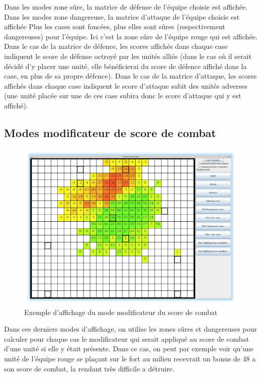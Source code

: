 			Dans les modes zone sûre, la matrice de défense de l'équipe choisie est affichée.
			Dans les modes zone dangereuse, la matrice d'attaque de l'équipe choisie est affichée
			Plus les cases sont foncées, plus elles sont sûres (respectivement dangereuses) pour l'équipe.
			Ici c'est la zone sûre de l'équipe rouge qui est affichée.
                        Dans le cas de la matrice de défence, les scores affichés dans chaque case indiquent le score de défense octroyé par les unités alliés (dans le cas où il serait décidé d'y placer une unité, elle bénéficierai du score de défence affiché dans la case, en plus de sa propre défence).
                        Dans le cas de la matrice d'attaque, les scores affichés dans chaque case indiquent le score d'attaque subit des unités adverses (une unité placée sur une de ces case subira donc le score d'attaque qui y est affiché).

			\clearpage

		\subsection{Modes modificateur de score de combat}
			\begin{figure}[!h]
				\centerline{\includegraphics[scale=0.4]{images/screen_fsmod.png}}
				\caption{Exemple d'affichage du mode modificateur du score de combat}
			\end{figure}
			Dans ces derniers modes d'affichage, on utilise les zones sûres et dangereuses pour calculer pour chaque cas le modificateur
			qui serait appliqué au score de combat d'une unité si elle y était présente.
			Dans ce cas, on peut par exemple voir qu'une unité de l'équipe rouge se plaçant sur le fort au milieu recevrait un bonus de 48 a son score de combat, la rendant très difficile a détruire.

